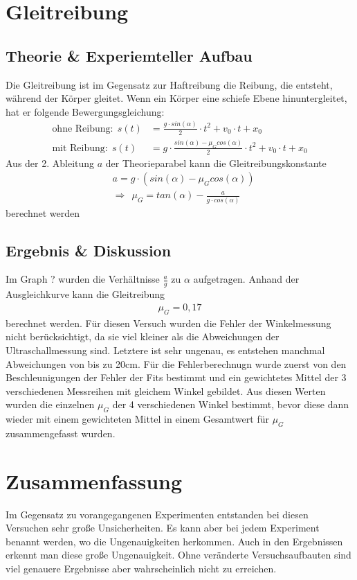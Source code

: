 \documentclass[11pt, a4paper]{article}
\begin{document}
    \section{Gleitreibung}

    \subsection{Theorie \& Experiemteller Aufbau}

    Die Gleitreibung ist im Gegensatz zur Haftreibung die Reibung, die entsteht, während der Körper gleitet.
    Wenn ein Körper eine schiefe Ebene hinuntergleitet, hat er folgende Bewergungsgleichung:
    \begin{align}
        \text{ohne Reibung:} \ \  s(t) &= \frac{g \cdot sin(\alpha)}{2} \cdot t^2 +v_0 \cdot t + x_0 \\
        \text{mit Reibung:} \ \  s(t) &= g \cdot \frac{sin(\alpha) -\mu_G cos(\alpha)}{2} \cdot t^2 +v_0 \cdot t + x_0
    \end{align}
    Aus der 2. Ableitung $a$ der Theorieparabel kann die Gleitreibungskonstante
    \begin{align}
        &a = g \cdot (sin(\alpha) - \mu_G cos(\alpha)) \\
        &\Rightarrow \ \ \mu_G = tan(\alpha) - \frac{a}{g \cdot cos(\alpha)}
    \end{align} 
    berechnet werden

    \subsection{Ergebnis \& Diskussion}
    Im Graph ? wurden die Verhältnisse $\frac{a}{g}$ zu $\alpha$ aufgetragen. Anhand der Ausgleichkurve kann die Gleitreibung
    \begin{align}
        \mu_G = 0,17
    \end{align}
    berechnet werden. Für diesen Versuch wurden die Fehler der Winkelmessung nicht berücksichtigt, da sie viel kleiner als
    die Abweichungen der Ultraschallmessung sind. Letztere ist sehr ungenau, es entstehen manchmal Abweichungen von bis zu 20cm.
     Für die Fehlerberechnugn wurde zuerst von den Beschleunigungen der
    Fehler der Fits bestimmt und ein gewichtetes Mittel der 3 verschiedenen Messreihen mit gleichem Winkel gebildet.
    Aus diesen Werten wurden die einzelnen $\mu_G$ der 4 verschiedenen Winkel bestimmt, bevor diese dann wieder
    mit einem gewichteten Mittel in einem Gesamtwert für $\mu_G$ zusammengefasst wurden.

    \section{Zusammenfassung}

    Im Gegensatz zu vorangegangenen Experimenten entstanden bei diesen Versuchen sehr große Unsicherheiten. Es kann aber 
    bei jedem Experiment benannt werden, wo die Ungenauigkeiten herkommen. Auch in den Ergebnissen erkennt man diese große Ungenauigkeit.
    Ohne veränderte Versuchsaufbauten sind viel genauere Ergebnisse aber wahrscheinlich nicht zu erreichen.

    
    
\end{document}
